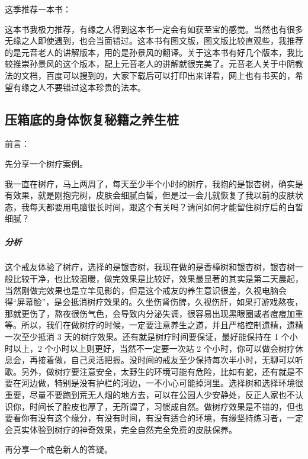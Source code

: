这季推荐一本书：

\begin{book}
    这本书我极力推荐，有缘之人得到这本书一定会有如获至宝的感觉。当然也有很多无缘之人即使遇到，也会当面错过。这本书有图文版，图文版比较直观些，我推荐的是元音老人的讲解版本，用的是孙景风的翻译。关于这本书有好几个版本，我比较推崇孙景风的这个版本，配上元音老人的讲解就很完美了。元音老人关于中阴教法的文档，百度可以搜到的，大家下载后可以打印出来详看，网上也有书买的，希望有缘之人不要错过这本珍贵的法本。
\end{book}

\subsection{压箱底的身体恢复秘籍之养生桩}

前言：

先分享一个树疗案例。

\begin{case}
    我一直在树疗，马上两周了，每天至少半个小时的树疗，我抱的是银杏树，确实是有效果，就是刚抱完树，皮肤会细腻白皙，但是过一会儿就恢复了我以前的皮肤状态，我每天都要用电脑很长时间，跟这个有关吗？请问如何才能留住树疗后的白皙细腻？
    \subparagraph{分析} 这个戒友体验了树疗，选择的是银杏树，我现在做的是香樟树和银杏树，银杏树一般比较干净，也比较温暖，做完效果是比较好，效果最显著的其实是第二天晨起，当然刚做完效果也是立竿见影的，但是这个戒友的养生意识很差，久视电脑会得“屏幕脸”，是会抵消树疗效果的。久坐伤肾伤脾，久视伤肝，如果打游戏熬夜，那就更伤了，熬夜很伤气色，会导致内分泌失调，很容易出现黑眼圈或者痘痘加重等。所以，我们在做树疗的时候，一定要注意养生之道，并且严格控制遗精，遗精一次至少抵消 3 天的树疗效果。还有就是树疗时间要保证，最好能保持在 1 个小时以上，2 个小时以上则更好，当然不一定要一次站 2 个小时，你可以做会树疗休息会，再接着做，自己灵活把握。没时间的戒友至少保持每次半小时，无聊可以听歌。另外，做树疗要注意安全，太野生的环境可能有危险，比如有蛇，还有就是不要在河边做，特别是没有护栏的河边，一不小心可能掉河里。选择树和选择环境很重要，尽量不要跑到荒无人烟的地方去，可以在公园人少安静处，反正人家也不认识你，时间长了脸皮也厚了，无所谓了，习惯成自然。做树疗效果是不错的，但也要看你有没有这个缘分，有没有时间，有没有适合的环境，有缘坚持练习者，一定会真实体验到树疗的神奇效果，完全自然完全免费的皮肤保养。
\end{case}

再分享一个戒色新人的答疑。

